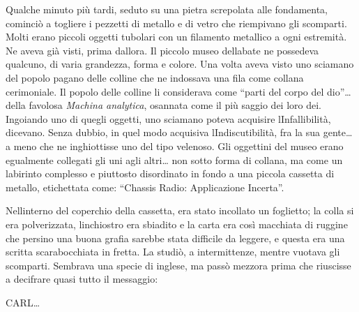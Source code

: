 Qualche minuto più tardi, seduto su una pietra screpolata alle
fondamenta, cominciò a togliere i pezzetti di metallo e di vetro che
riempivano gli scomparti. Molti erano piccoli oggetti tubolari con un
filamento metallico a ogni estremità. Ne aveva già visti, prima
d\textquotesingle allora. Il piccolo museo dell\textquotesingle abate ne
possedeva qualcuno, di varia grandezza, forma e colore. Una volta aveva
visto uno sciamano del popolo pagano delle colline che ne indossava una
fila come collana cerimoniale. Il popolo delle colline li considerava
come ``parti del corpo del dio''\ldots{} della favolosa \emph{Machina
	analytica}, osannata come il più saggio dei loro dei. Ingoiando uno di
quegli oggetti, uno sciamano poteva acquisire
l\textquotesingle Infallibilità, dicevano. Senza dubbio, in quel modo
acquisiva l\textquotesingle Indiscutibilità, fra la sua gente\ldots{} a
meno che ne inghiottisse uno del tipo velenoso. Gli oggettini del museo
erano egualmente collegati gli uni agli altri\ldots{} non sotto forma di
collana, ma come un labirinto complesso e piuttosto disordinato in fondo
a una piccola cassetta di metallo, etichettata come: ``Chassis Radio:
Applicazione Incerta''.

Nell\textquotesingle interno del coperchio della cassetta, era stato
incollato un foglietto; la colla si era polverizzata,
l\textquotesingle inchiostro era sbiadito e la carta era così macchiata
di ruggine che persino una buona grafia sarebbe stata difficile da
leggere, e questa era una scritta scarabocchiata in fretta. La studiò, a
intermittenze, mentre vuotava gli scomparti. Sembrava una specie di
inglese, ma passò mezz\textquotesingle ora prima che riuscisse a
decifrare quasi tutto il messaggio:

\begin{center}
	CARL\ldots{}
\end{center}

\begin{center}
\end{center}

